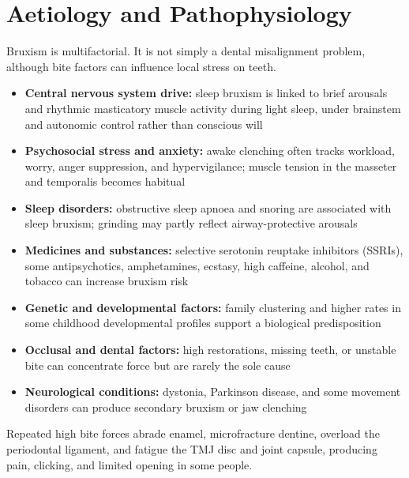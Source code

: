 \section*{Aetiology and Pathophysiology}
Bruxism is multifactorial. It is not simply a dental misalignment problem, although bite factors can influence local stress on teeth.

\begin{itemize}
    \item \textbf{Central nervous system drive:} sleep bruxism is linked to brief arousals and rhythmic masticatory muscle activity during light sleep, under brainstem and autonomic control rather than conscious will
    \item \textbf{Psychosocial stress and anxiety:} awake clenching often tracks workload, worry, anger suppression, and hypervigilance; muscle tension in the masseter and temporalis becomes habitual
    \item \textbf{Sleep disorders:} obstructive sleep apnoea and snoring are associated with sleep bruxism; grinding may partly reflect airway-protective arousals
    \item \textbf{Medicines and substances:} selective serotonin reuptake inhibitors (SSRIs), some antipsychotics, amphetamines, ecstasy, high caffeine, alcohol, and tobacco can increase bruxism risk
    \item \textbf{Genetic and developmental factors:} family clustering and higher rates in some childhood developmental profiles support a biological predisposition
    \item \textbf{Occlusal and dental factors:} high restorations, missing teeth, or unstable bite can concentrate force but are rarely the sole cause
    \item \textbf{Neurological conditions:} dystonia, Parkinson disease, and some movement disorders can produce secondary bruxism or jaw clenching
\end{itemize}

Repeated high bite forces abrade enamel, microfracture dentine, overload the periodontal ligament, and fatigue the TMJ disc and joint capsule, producing pain, clicking, and limited opening in some people.

